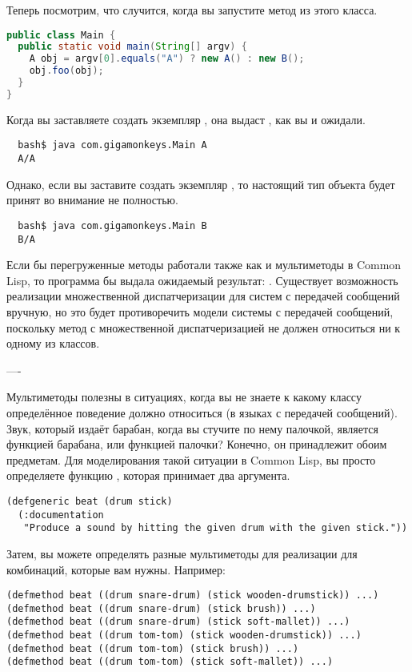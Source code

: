 Теперь посмотрим, что случится, когда вы запустите метод  из этого класса.

\begin{lstlisting}[language=java]
public class Main {
  public static void main(String[] argv) {
    A obj = argv[0].equals("A") ? new A() : new B();
    obj.foo(obj);
  }
}
\end{lstlisting}

Когда вы заставляете  создать экземпляр , она выдаст , как вы и
ожидали.

\begin{verbatim}
  bash$ java com.gigamonkeys.Main A
  A/A
\end{verbatim}

Однако, если вы заставите  создать экземпляр , то настоящий тип объекта
 будет принят во внимание не полностью.

\begin{verbatim}
  bash$ java com.gigamonkeys.Main B
  B/A
\end{verbatim}

Если бы перегруженные методы работали также как и мультиметоды в Common Lisp, то программа
бы выдала ожидаемый результат: .  Существует возможность реализации
множественной диспатчеризации для систем с передачей сообщений вручную, но это будет
противоречить модели системы с передачей сообщений, поскольку метод с множественной
диспатчеризацией не должен относиться ни к одному из классов.

----

Мультиметоды полезны в ситуациях, когда вы не знаете к какому классу определённое
поведение должно относиться (в языках с передачей сообщений).  Звук, который издаёт
барабан, когда вы стучите по нему палочкой, является функцией барабана, или функцией
палочки?  Конечно, он принадлежит обоим предметам.  Для моделирования такой ситуации в
Common Lisp, вы просто определяете функцию , которая принимает два аргумента.

\begin{lstlisting}
(defgeneric beat (drum stick)
  (:documentation
   "Produce a sound by hitting the given drum with the given stick."))
\end{lstlisting}

Затем, вы можете определять разные мультиметоды для реализации  для комбинаций,
которые вам нужны. Например:

\begin{lstlisting}
(defmethod beat ((drum snare-drum) (stick wooden-drumstick)) ...)
(defmethod beat ((drum snare-drum) (stick brush)) ...)
(defmethod beat ((drum snare-drum) (stick soft-mallet)) ...)
(defmethod beat ((drum tom-tom) (stick wooden-drumstick)) ...)
(defmethod beat ((drum tom-tom) (stick brush)) ...)
(defmethod beat ((drum tom-tom) (stick soft-mallet)) ...)
\end{lstlisting}

